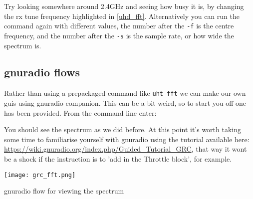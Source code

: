 
Try looking somewhere around 2.4GHz and seeing how busy it is, by changing the rx tune frequency highlighted in \cref{uhd_fft}. Alternatively you can run the command again with different values, the number after the \verb|-f| is the centre frequency, and the number after the \verb|-s| is the sample rate, or how wide the spectrum is.

\subsection{gnuradio flows}
Rather than using a prepackaged command like \verb|uht_fft| we can make our own \gls{gui}s using gnuradio companion. This can be a bit weird, so to start you off one has been provided. From the command line enter:



You should see the spectrum as we did before. At this point it's worth taking some time to familiarise yourself with gnuradio using the tutorial available here: \url{https://wiki.gnuradio.org/index.php/Guided\_Tutorial\_GRC}, that way it wont be a shock if the instruction is to 'add in the Throttle block', for example.

\centrefigurestart
\texttt{[image: grc\_fft.png]}
\caption{gnuradio flow for viewing the spectrum}
\label{grc_fft}
\centrefigureend